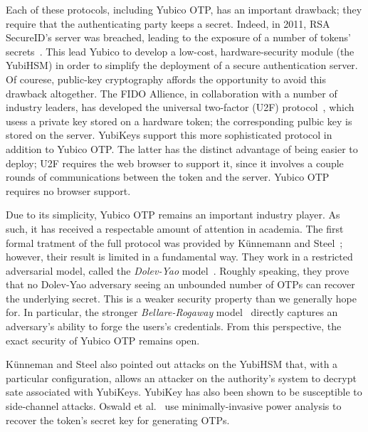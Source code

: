 Each of these protocols, including Yubico OTP, has an important drawback; they
require that the authenticating party keeps a secret. Indeed, in 2011, RSA
SecureID's server was breached, leading to the exposure of a number of tokens'
secrets~\cite{kaminsky2011securid}. This lead Yubico to develop a low-cost,
hardware-security module (the YubiHSM) in order to simplify the deployment of a
secure authentication server.
%
Of courese, public-key cryptography affords the opportunity to avoid this
drawback altogether. The FIDO Allience, in collaboration with a number of
industry leaders, has developed the universal two-factor (U2F)
protocol~\cite{u2f}, which usess a private key stored on a hardware token; the
corresponding pulbic key is stored on the server.
%
YubiKeys support this more sophisticated protocol in addition to Yubico OTP. The
latter has the distinct advantage of being easier to deploy; U2F requires the
web browser to support it, since it involves a couple rounds of communications
between the token and the server. Yubico OTP requires no browser support.

Due to its simplicity, Yubico OTP remains an important industry player. As such,
it has received a respectable amount of attention in academia.
%
The first formal tratment of the full protocol was provided by K\"unnemann and
Steel~\cite{kuennemann2012yubisecure}; however, their result is limited in a
fundamental way. They work in a restricted adversarial model, called the
\emph{Dolev-Yao} model~\cite{herzog2005computational}. Roughly speaking, they
prove that no Dolev-Yao adversary seeing an unbounded number of OTPs can recover
the underlying secret. This is a weaker security property than we generally hope
for. In particular, the stronger \emph{Bellare-Rogaway}
model~\cite{bellare1993entity} directly captures an adversary's ability to forge
the users's credentials.  From this perspective, the exact security of Yubico
OTP remains open.

K\"unneman and Steel also pointed out attacks on the YubiHSM that, with a
particular configuration, allows an attacker on the authority's system to
decrypt sate associated with YubiKeys.
%
YubiKey has also been shown to be susceptible to side-channel attacks. Oswald et
al.~\cite{oswald2013side-channel} use minimally-invasive power analysis to
recover the token's secret key for generating OTPs.

